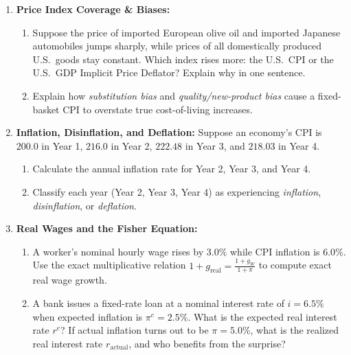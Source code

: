 \documentclass[11pt,letterpaper]{article}
\begin{document}
\begin{enumerate}
    \item \textbf{Price Index Coverage \& Biases:}
    \begin{enumerate}
        \item Suppose the price of imported European olive oil and imported Japanese automobiles jumps sharply, while prices of all domestically produced U.S.\ goods stay constant. Which index rises more: the U.S.\ CPI or the U.S.\ GDP Implicit Price Deflator? Explain why in one sentence.
        \item Explain how \emph{substitution bias} and \emph{quality/new-product bias} cause a fixed-basket CPI to overstate true cost-of-living increases.
    \end{enumerate}
    \item \textbf{Inflation, Disinflation, and Deflation:} Suppose an economy's CPI is $200.0$ in Year 1, $216.0$ in Year 2, $222.48$ in Year 3, and $218.03$ in Year 4.
    \begin{enumerate}
        \item Calculate the annual inflation rate for Year 2, Year 3, and Year 4.
        \item Classify each year (Year 2, Year 3, Year 4) as experiencing \emph{inflation}, \emph{disinflation}, or \emph{deflation}.
    \end{enumerate}
    \item \textbf{Real Wages and the Fisher Equation:}
    \begin{enumerate}
        \item A worker's nominal hourly wage rises by $3.0\%$ while CPI inflation is $6.0\%$. Use the exact multiplicative relation $1 + g_{\text{real}} = \frac{1 + g_W}{1 + \pi}$ to compute exact real wage growth.
        \item A bank issues a fixed-rate loan at a nominal interest rate of $i = 6.5\%$ when expected inflation is $\pi^e = 2.5\%$. What is the expected real interest rate $r^e$? If actual inflation turns out to be $\pi = 5.0\%$, what is the realized real interest rate $r_{\text{actual}}$, and who benefits from the surprise?
    \end{enumerate}
\end{enumerate}
\end{document}
